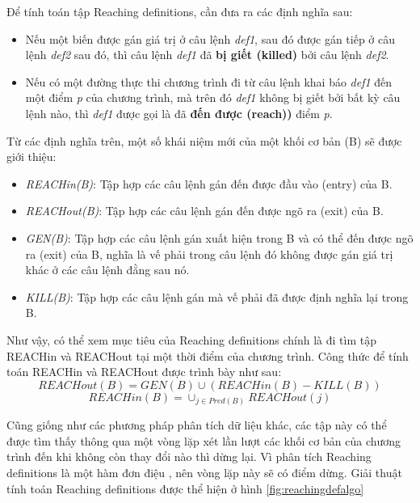Để tính toán tập Reaching definitions, cần đưa ra các định nghĩa sau:

\begin{itemize}
	\item Nếu một biến được gán giá trị ở câu lệnh \textit{def1}, sau đó được gán tiếp ở câu lệnh \textit{def2} sau đó, thì câu lệnh \textit{def1} đã \textbf{bị giết (killed)} bởi câu lệnh \textit{def2}.
	\item Nếu có một đường thực thi chương trình đi từ câu lệnh khai báo \textit{def1} đến một điểm \textit{p} của chương trình, mà trên đó \textit{def1} không bị giết bởi bất kỳ câu lệnh nào, thì \textit{def1} được gọi là đã \textbf{đến được (reach))} điểm \textit{p}.
\end{itemize}

Từ các định nghĩa trên, một số khái niệm mới của một khối cơ bản (B) sẽ được giới thiệu:
\begin{itemize}
	\item \textit{REACHin(B)}: Tập hợp các câu lệnh gán đến được đầu vào (entry) của B.
	\item \textit{REACHout(B)}: Tập hợp các câu lệnh gán đến được ngõ ra (exit) của B.
	\item \textit{GEN(B)}: Tập hợp các câu lệnh gán xuất hiện trong B và có thể đến được ngõ ra (exit) của B, nghĩa là vế phải trong câu lệnh đó không được gán giá trị khác ở các câu lệnh đằng sau nó.
	\item \textit{KILL(B)}: Tập hợp các câu lệnh gán mà vế phải đã được định nghĩa lại trong B.
\end{itemize}

Như vậy, có thể xem mục tiêu của Reaching definitions chính là đi tìm tập REACHin và REACHout tại một thời điểm của chương trình. Công thức để tính toán REACHin và REACHout được trình bày như sau:
\begin{equation} \label{eq:reachout}
REACHout(B) = GEN(B) \cup (REACHin(B)-KILL(B))
\end{equation}	
\begin{equation} \label{eq:reachin}
REACHin(B) = \cup_{j \in Pred(B)} REACHout(j)
\end{equation}	

Cũng giống như các phương pháp phân tích dữ liệu khác, các tập này có thể được tìm thấy thông qua một vòng lặp xét lần lượt các khối cơ bản của chương trình đến khi không còn thay đổi nào thì dừng lại. Vì phân tích Reaching definitions là một hàm đơn điệu \cite{monoreach}, nên vòng lặp này sẽ có điểm dừng. Giải thuật tính toán Reaching definitions được thể hiện ở hình \ref{fig:reachingdefalgo}


